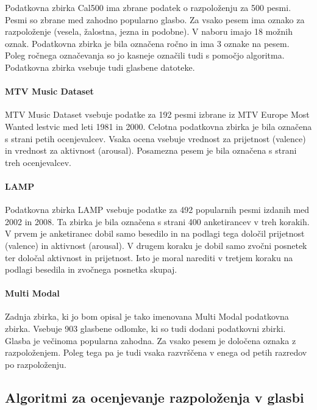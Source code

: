 \documentclass[a4paper, 12pt]{book}
\begin{document}
{Podatkovna zbirka Cal500 \cite{turnbull2008semantic} ima zbrane podatek o razpoloženju za 500 pesmi. Pesmi so zbrane med zahodno popularno glasbo. Za vsako pesem ima oznako za razpoloženje (vesela, žalostna, jezna in podobne). V naboru imajo 18 možnih oznak. Podatkovna zbirka je bila označena ročno in ima 3 oznake na pesem. Poleg ročnega označevanja so jo kasneje označili tudi s pomočjo algoritma. Podatkovna zbirka vsebuje tudi glasbene datoteke.

\paragraph{MTV Music Dataset}

MTV Music Dataset \cite{schuller2010mister} vsebuje podatke za 192 pesmi izbrane iz MTV Europe Most Wanted lestvic med leti 1981 in 2000. Celotna podatkovna zbirka je bila označena s strani petih ocenjevalcev. Vsaka ocena vsebuje vrednost za prijetnost (valence) in vrednost za aktivnost (arousal). Posamezna pesem je bila označena s strani treh ocenjevalcev.

\paragraph{LAMP}

Podatkovna zbirka LAMP \cite{chu2010lamp} vsebuje podatke za 492 popularnih pesmi izdanih med 2002 in 2008. Ta zbirka je bila označena s strani 400 anketirancev v treh korakih. V prvem je anketiranec dobil samo besedilo in  na podlagi tega določil prijetnost (valence) in aktivnost (arousal). V drugem koraku je dobil samo zvočni posnetek ter določal aktivnost in prijetnost. Isto je moral narediti v tretjem koraku na podlagi besedila in zvočnega posnetka skupaj. 

\paragraph{Multi Modal}

Zadnja zbirka, ki jo bom opisal je tako imenovana Multi Modal \cite{panda2013multi} podatkovna zbirka. Vsebuje 903 glasbene odlomke, ki so tudi dodani podatkovni zbirki. Glasba je večinoma popularna zahodna. Za vsako pesem je določena oznaka z razpoloženjem. Poleg tega pa je tudi vsaka razvrščena v enega od petih razredov po razpoloženju. 

\subsection{Algoritmi za ocenjevanje razpoloženja v glasbi} 

}
\end{document}
